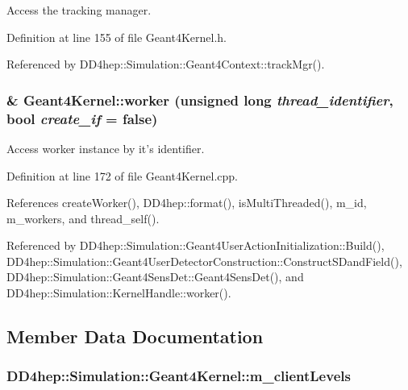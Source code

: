 Access the tracking manager. 

Definition at line 155 of file Geant4Kernel.h.

Referenced by DD4hep::Simulation::Geant4Context::trackMgr().\hypertarget{class_d_d4hep_1_1_simulation_1_1_geant4_kernel_ac503376a3f593e2c97dcf78fb289fe49}{
\subsubsection[{worker}]{ \& Geant4Kernel::worker (unsigned long {\em thread\_\-identifier}, \/  bool {\em create\_\-if} = {\ttfamily false})}}
\label{class_d_d4hep_1_1_simulation_1_1_geant4_kernel_ac503376a3f593e2c97dcf78fb289fe49}


Access worker instance by it's identifier. 

Definition at line 172 of file Geant4Kernel.cpp.

References createWorker(), DD4hep::format(), isMultiThreaded(), m\_\-id, m\_\-workers, and thread\_\-self().

Referenced by DD4hep::Simulation::Geant4UserActionInitialization::Build(), DD4hep::Simulation::Geant4UserDetectorConstruction::ConstructSDandField(), DD4hep::Simulation::Geant4SensDet::Geant4SensDet(), and DD4hep::Simulation::KernelHandle::worker().

\subsection{Member Data Documentation}
\hypertarget{class_d_d4hep_1_1_simulation_1_1_geant4_kernel_a6693f4923ea60f878c15f665edf79de2}{
\subsubsection[{m\_\-clientLevels}]{ {\bf DD4hep::Simulation::Geant4Kernel::m\_\-clientLevels}}}
\label{class_d_d4hep_1_1_simulation_1_1_geant4_kernel_a6693f4923ea60f878c15f665edf79de2}


